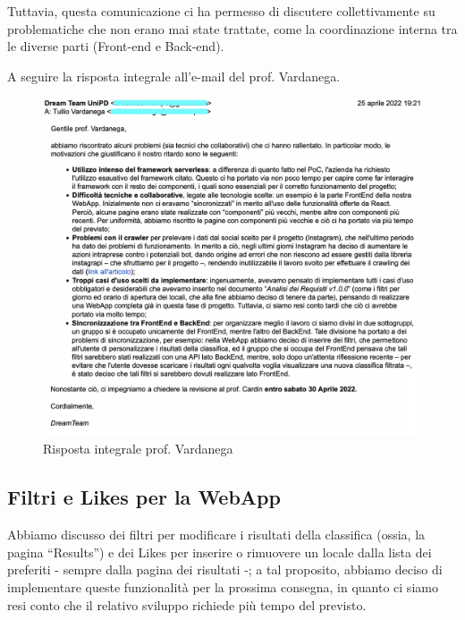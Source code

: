 Tuttavia, questa comunicazione ci ha permesso di discutere collettivamente su problematiche che non erano mai state trattate, come la coordinazione interna tra le diverse parti (Front-end e Back-end).  

A seguire la risposta integrale all'e-mail del prof. Vardanega.

\begin{figure}[H]
\centering
\includegraphics[scale=0.6]{Sezioni/images/copiaemail.png}
\caption{Risposta integrale prof. Vardanega}
\end{figure}

\subsection{Filtri e Likes per la WebApp}

Abbiamo discusso dei filtri per modificare i risultati della classifica (ossia, la pagina “Results”) e dei Likes per inserire o rimuovere un locale dalla lista dei preferiti - sempre dalla pagina dei risultati -; a tal proposito, abbiamo deciso di implementare queste funzionalità per la prossima consegna, in quanto ci siamo resi conto che il relativo sviluppo richiede più tempo del previsto. 


